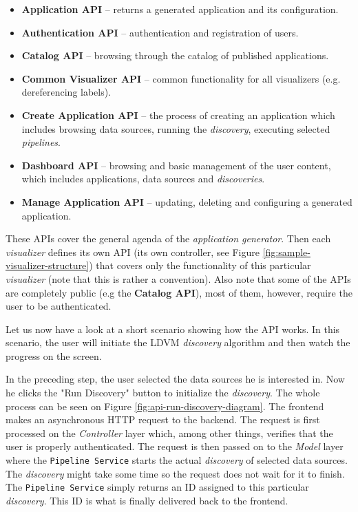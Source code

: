 \begin{itemize}
\item \textbf{Application API} -- returns a generated application and its configuration.
\item \textbf{Authentication API} -- authentication and registration of users.
\item \textbf{Catalog API} -- browsing through the catalog of published applications.
\item \textbf{Common Visualizer API} -- common functionality for all visualizers (e.g. dereferencing labels).
\item \textbf{Create Application API} -- the process of creating an application which includes browsing data sources, running the \emph{discovery}, executing selected \emph{pipelines}.
\item \textbf{Dashboard API} -- browsing and basic management of the user content, which includes applications, data sources and \emph{discoveries}.
\item \textbf{Manage Application API} -- updating, deleting and configuring a generated application.
\end{itemize}

These APIs cover the general agenda of the \emph{application generator}. Then each \emph{visualizer} defines its own API (its own controller, see Figure \ref{fig:sample-visualizer-structure}) that covers only the functionality of this particular \emph{visualizer} (note that this is rather a convention). Also note that some of the APIs are completely public (e.g the \textbf{Catalog API}), most of them, however, require the user to be authenticated.

Let us now  have a look at a short scenario showing how the API works. In this scenario, the user will initiate the LDVM \emph{discovery} algorithm and then watch the progress on the screen.

In the preceding step, the user selected the data sources he is interested in. Now he clicks the "Run Discovery" button to initialize the \emph{discovery}. The whole process can be seen on Figure \ref{fig:api-run-discovery-diagram}. The frontend makes an asynchronous HTTP request to the backend. The request is first processed on the \emph{Controller} layer which, among other things, verifies that the user is properly authenticated. The request is then passed on to the \emph{Model} layer where the \texttt{Pipeline Service} starts the actual \emph{discovery} of selected data sources. The \emph{discovery} might take some time so the request does not wait for it to finish. The \texttt{Pipeline Service} simply returns an ID assigned to this particular \emph{discovery}. This ID is what is finally delivered back to the frontend.

